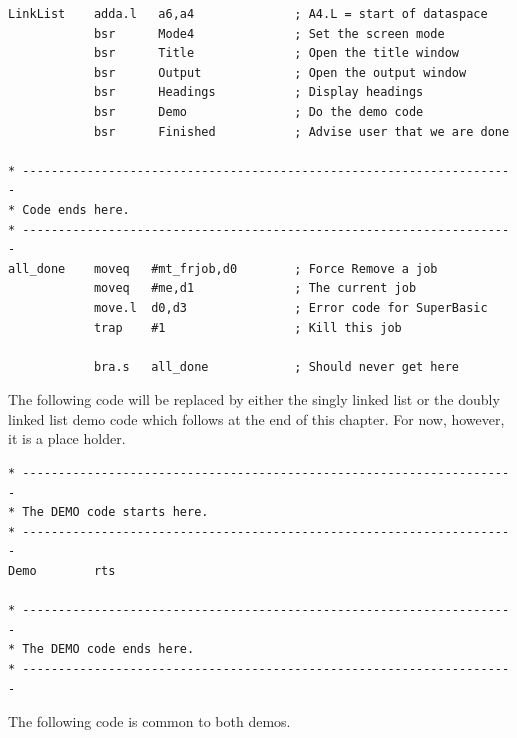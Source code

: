 \begin{lstlisting}[firstnumber=1,caption={Linked Lists - Wrapper - Part 1},label={LinkedListsWrapperPart1}]
LinkList    adda.l   a6,a4              ; A4.L = start of dataspace
            bsr      Mode4              ; Set the screen mode
            bsr      Title              ; Open the title window
            bsr      Output             ; Open the output window
            bsr      Headings           ; Display headings
            bsr      Demo               ; Do the demo code
            bsr      Finished           ; Advise user that we are done

* ---------------------------------------------------------------------
* Code ends here.
* ---------------------------------------------------------------------
all_done    moveq   #mt_frjob,d0        ; Force Remove a job
            moveq   #me,d1              ; The current job
            move.l  d0,d3               ; Error code for SuperBasic
            trap    #1                  ; Kill this job

            bra.s   all_done            ; Should never get here
\end{lstlisting}

\begin{note}
The following code will be replaced by either the singly linked
        list or the doubly linked list demo code which follows at the end of
        this chapter. For now, however, it is a place holder.
\end{note}

\begin{lstlisting}[firstnumber=last,caption={Linked Lists - Wrapper - Demo Placeholder},label={LinkedListsWrapperDemoPlaceholder}]
* ---------------------------------------------------------------------
* The DEMO code starts here.
* ---------------------------------------------------------------------
Demo        rts

* ---------------------------------------------------------------------
* The DEMO code ends here.
* ---------------------------------------------------------------------
\end{lstlisting}

\begin{note}
The following code is common to both demos.
\end{note}

